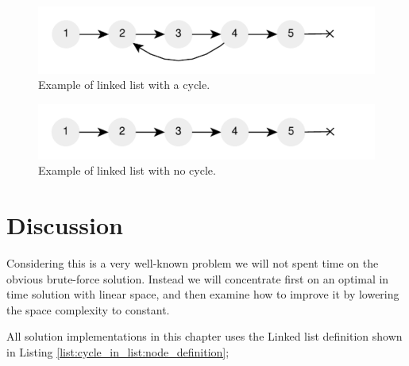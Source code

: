 \begin{figure}
	\centering
	\includegraphics[scale=1.0]{sources/cycle_in_list/images/list_cycle}
	\caption{Example of linked list with a cycle.}
	\label{fig:cycle_in_list:example1}
\end{figure}
\begin{figure}
	\label{fig:cycle_in_list:example2}
	\centering
	\includegraphics[scale=1.0]{sources/cycle_in_list/images/list_no_cycle}
	\caption{Example of linked list with no cycle.}
\end{figure}

%
%

\section{Discussion}
\label{cycle_in_list:sec:discussion}
Considering this is a very well-known problem we will not spent time on the obvious
brute-force solution. Instead we will concentrate first on an optimal in time solution with
linear space, and then examine how to improve it by lowering the space complexity to
constant. 

All solution implementations in this chapter uses the  Linked list definition shown in Listing \ref{list:cycle_in_list:node_definition};


	


